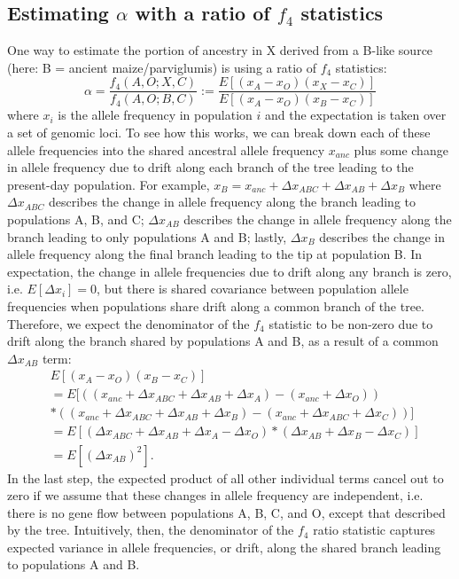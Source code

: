 \documentclass[12pt]{report}
\begin{document}
\subsection{Estimating $\alpha$ with a ratio of $f_4$ statistics}
One way to estimate the portion of ancestry in X derived from a B-like source (here: B = ancient maize/parviglumis) is using a ratio of $f_4$ statistics:
\begin{equation}
\alpha = \frac{f_4(A,O;X,C)}{f_4(A,O;B,C)} := \frac{E[(x_A - x_O)(x_X - x_C)]}{E[(x_A - x_O)(x_B - x_C)]}
\end{equation}
where $x_i$ is the allele frequency in population $i$ and the expectation is taken over a set of genomic loci. To see how this works, we can break down each of these allele frequencies into the shared ancestral allele frequency $x_{anc}$ plus some change in allele frequency due to drift along each branch of the tree leading to the present-day population. For example, $x_B = x_{anc} + \Delta{x_{ABC}} + \Delta{x_{AB}} + \Delta{x_B}$ where $\Delta{x_{ABC}}$ describes the change in allele frequency along the branch leading to populations A, B, and C; $\Delta{x_{AB}}$ describes the change in allele frequency along the branch leading to only populations A and B; lastly, $\Delta{x_B}$ describes the change in allele frequency along the final branch leading to the tip at population B. In expectation, the change in allele frequencies due to drift along any branch is zero, i.e. $E[\Delta{x_i}]=0$, but there is shared covariance between population allele frequencies when populations share drift along a common branch of the tree. Therefore, we expect the denominator of the $f_4$ statistic to be non-zero due to drift along the branch shared by populations A and B, as a result of a common $\Delta{x_{AB}}$ term:
\begin{align*}
&E[(x_A - x_O)(x_B - x_C)] \\
&= E[((x_{anc} + \Delta{x_{ABC}} + \Delta{x_{AB}} + \Delta{x_{A}}) - (x_{anc} + \Delta{x_{O}})) \\
&*((x_{anc} + \Delta{x_{ABC}} + \Delta{x_{AB}} + \Delta{x_B}) - (x_{anc} + \Delta{x_{ABC}} + \Delta{x_C}))] \\
&=E[(\Delta{x_{ABC}} + \Delta{x_{AB}} + \Delta{x_{A}} - \Delta{x_{O}})*(\Delta{x_{AB}} + \Delta{x_B} - \Delta{x_C})]\\
&=E[(\Delta{x_{AB}})^2].
\end{align*}
In the last step, the expected product of all other individual terms cancel out to zero if we assume that these changes in allele frequency are independent, i.e. there is no gene flow between populations A, B, C, and O, except that described by the tree. Intuitively, then, the denominator of the $f_4$ ratio statistic captures expected variance in allele frequencies, or drift, along the shared branch leading to populations A and B.\par
\end{document}
